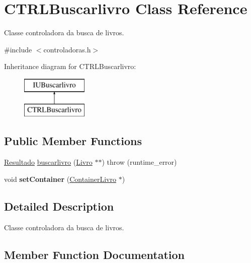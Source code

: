\hypertarget{classCTRLBuscarlivro}{}\section{C\+T\+R\+L\+Buscarlivro Class Reference}
\label{classCTRLBuscarlivro}


Classe controladora da busca de livros.  




{\ttfamily \#include $<$controladoras.\+h$>$}

Inheritance diagram for C\+T\+R\+L\+Buscarlivro\+:\begin{figure}[H]
\begin{center}
\leavevmode
\includegraphics[height=2.000000cm]{classCTRLBuscarlivro}
\end{center}
\end{figure}
\subsection*{Public Member Functions}
\begin{DoxyCompactItemize}
\item 
\hyperlink{classResultado}{Resultado} \hyperlink{classCTRLBuscarlivro_a220f5a7d88a1316eb04a37cacc20c542}{buscarlivro} (\hyperlink{classLivro}{Livro} $\ast$$\ast$)  throw (runtime\+\_\+error)
\item 
\mbox{\label{classCTRLBuscarlivro_a9ba558c715f6af58b8694b8fbd8cde49}} 
void {\bfseries set\+Container} (\hyperlink{classContainerLivro}{Container\+Livro} $\ast$)
\end{DoxyCompactItemize}


\subsection{Detailed Description}
Classe controladora da busca de livros. 

\subsection{Member Function Documentation}
\mbox{\label{classCTRLBuscarlivro_a220f5a7d88a1316eb04a37cacc20c542}} 
